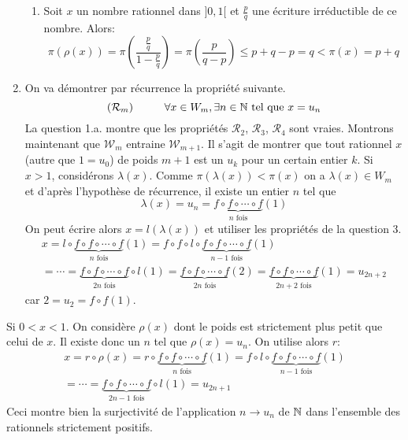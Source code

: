 \begin{enumerate}
\begin{enumerate}
 \item Soit $x$ un nombre rationnel dans $]0,1[$ et $\frac{p}{q}$ une écriture irréductible de ce nombre. Alors:
\begin{displaymath}
 \pi(\rho(x))=\pi(\frac{\frac{p}{q}}{1-\frac{p}{q}})= \pi(\frac{p}{q-p})\leq p + q-p = q< \pi(x)=p+q
\end{displaymath}
\end{enumerate}

 \item  On va démontrer par récurrence la propriété suivante.
\begin{displaymath}
 (\mathcal R_m)\hspace{1cm}\forall x\in W_m, \exists n\in \mathbb{N} \text{ tel que } x=u_n
\end{displaymath}
La question 1.a. montre que les propriétés $\mathcal R_2$, $\mathcal R_3$, $\mathcal R_4$ sont vraies. Montrons maintenant que $\mathcal W_m$ entraine $\mathcal W_{m+1}$.\newline
Il s'agit de montrer que tout rationnel $x$ (autre que $1=u_0$) de poids $m+1$ est un $u_k$ pour un certain entier $k$.\newline
Si $x>1$, considérons $\lambda(x)$. Comme $\pi(\lambda(x))<\pi(x)$ on a $\lambda(x)\in W_m$ et d'après l'hypothèse de récurrence, il existe un entier $n$ tel que 
\begin{displaymath}
 \lambda(x) = u_n = \underset{n\text{ fois}}{\underbrace{f\circ f\circ \cdots \circ f}}(1)
\end{displaymath}
On peut écrire alors $x=l(\lambda(x))$ et utiliser les propriétés de la question 3.
\begin{multline*}
 x = l\circ \underset{n\text{ fois}}{\underbrace{f\circ f\circ \cdots \circ f}}(1)
= f\circ f \circ l \circ \underset{n-1\text{ fois}}{\underbrace{f\circ f\circ \cdots \circ f}}(1)\\
= \cdots 
= \underset{2n\text{ fois}}{\underbrace{f\circ f\circ \cdots \circ f}}\circ l(1)
= \underset{2n\text{ fois}}{\underbrace{f\circ f\circ \cdots \circ f}}(2)
=\underset{2n+2\text{ fois}}{\underbrace{f\circ f\circ \cdots \circ f}}(1)=u_{2n+2}
\end{multline*}
car $2=u_2=f\circ f(1)$.
\end{enumerate}
Si $0<x<1$. On considère $\rho(x)$ dont le poids est strictement plus petit que celui de $x$. Il existe donc un $n$ tel que $\rho(x)=u_n$. On utilise alors $r$:
\begin{multline*}
 x=r\circ\rho(x)=r\circ \underset{n\text{ fois}}{\underbrace{f\circ f\circ \cdots \circ f}}(1)
= f\circ l \circ \underset{n-1\text{ fois}}{\underbrace{f\circ f\circ \cdots \circ f}}(1)\\
=\cdots
= \underset{2n-1\text{ fois}}{\underbrace{f\circ f\circ \cdots \circ f}}\circ l (1)=u_{2n+1}
\end{multline*}
Ceci montre bien la surjectivité de l'application  $n\rightarrow u_n$ de $\mathbb{N}$ dans l'ensemble des rationnels strictement positifs.
